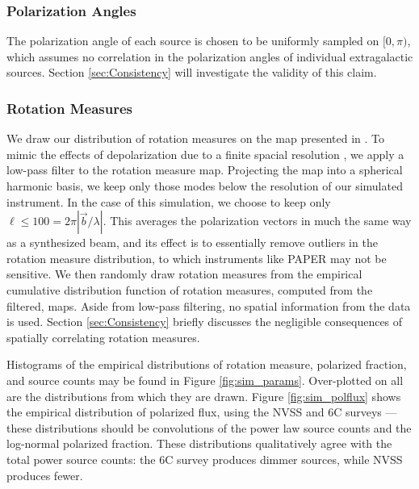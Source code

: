 \subsubsection*{Polarization Angles}
The polarization angle of each source is chosen to be uniformly sampled on $[0,\pi)$, which assumes no correlation in the polarization angles of individual extragalactic sources. Section \ref{sec:Consistency} 
will investigate the validity of this claim.

\subsubsection*{Rotation Measures}

We draw our distribution of rotation measures on the map presented in \citet{Oppermann2012}. To
mimic the effects of depolarization due to a finite spacial resolution \cite{Law2011}, we apply a
low-pass filter to the rotation measure map. Projecting the map into a spherical harmonic basis, we
keep only those modes below the resolution of our simulated instrument. In the case of this
simulation, we choose to keep only $\ell \le 100 = 2\pi |\vec{b}/\lambda|$. This averages the
polarization vectors in much the same way as a synthesized beam, and its effect is to essentially
remove outliers in the rotation measure distribution, to which instruments like PAPER may not be
sensitive. We then randomly draw rotation measures from the empirical cumulative distribution
function of rotation measures, computed from the filtered, \citet{Oppermann2012} maps. Aside from low-pass
filtering, no spatial information from the data is used. Section \ref{sec:Consistency} briefly
discusses the negligible consequences of spatially correlating rotation measures.

Histograms of the empirical distributions of rotation measure, polarized fraction, and source counts may be
found in Figure \ref{fig:sim_params}. Over-plotted on all are the distributions from which they are
drawn. Figure \ref{fig:sim_polflux} shows the empirical distribution of polarized flux, using the
NVSS and 6C surveys --- these distributions should be convolutions of the power law source counts
and the log-normal polarized fraction. These distributions qualitatively agree with the total power 
source counts: the 6C survey produces dimmer sources, while NVSS produces fewer.

